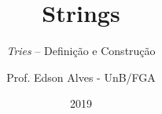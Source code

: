 \title{Strings}
\subtitle{{\it Tries} -- Definição e Construção}
\author{Prof. Edson Alves - UnB/FGA}
\date{2019}
